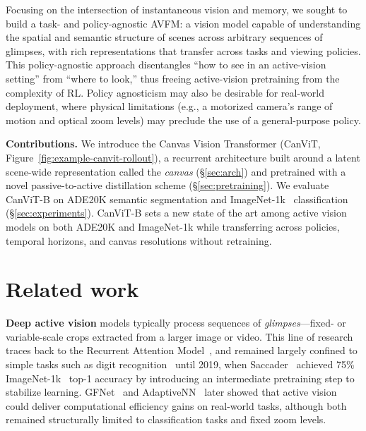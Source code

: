 \documentclass{article}
\begin{document}
Focusing on the intersection of instantaneous vision and memory,
we sought to build a task- and policy-agnostic \ac{AVFM}:
a vision model capable of understanding the spatial and semantic structure of scenes
across arbitrary sequences of glimpses,
with rich representations that transfer across tasks and viewing policies.
This policy-agnostic approach disentangles ``how to see in an active-vision setting'' from ``where to look,''
thus freeing active-vision pretraining from the complexity of \ac{RL}.
Policy agnosticism may also be desirable for real-world deployment,
where physical limitations (e.g., a motorized camera's range of motion and optical zoom levels) may preclude the use of a general-purpose policy.

\textbf{Contributions.}
We introduce the Canvas Vision Transformer (CanViT, Figure~\ref{fig:example-canvit-rollout}),
a recurrent architecture
built around a latent scene-wide representation called the \emph{canvas} (\S\ref{sec:arch})
and pretrained with a novel passive-to-active distillation scheme (\S\ref{sec:pretraining}).
We evaluate CanViT-B
on ADE20K semantic segmentation
and ImageNet-1k~\cite{russakovskyImageNetLargeScale2015} classification (\S\ref{sec:experiments}).
CanViT-B sets a new state of the art among active vision models on both ADE20K and ImageNet-1k
while transferring across policies, temporal horizons, and canvas resolutions without retraining.


\section{Related work}
\label{sec:related-work}

\textbf{Deep active vision} models typically process sequences of \emph{glimpses}---fixed- or variable-scale crops extracted from a larger image or video.
This line of research traces back to the Recurrent Attention Model~\cite{mnihRecurrentModelsVisual2014},
and remained largely confined to simple tasks such as digit recognition~\cite{DRAMBaMK14,ablavatski2017enriched}
until 2019, when Saccader~\cite{elsayedSaccaderImprovingAccuracy2019}
achieved 75\% ImageNet-1k~\cite{russakovskyImageNetLargeScale2015} top-1 accuracy by
introducing an intermediate pretraining step to stabilize learning.
GFNet~\cite{wangGlanceFocusDynamic2020} and AdaptiveNN~\cite{wangEmulatingHumanlikeAdaptive2025}
later showed that active vision could deliver computational efficiency gains on real-world tasks,
although both remained structurally limited to classification tasks and fixed zoom levels.
\end{document}
